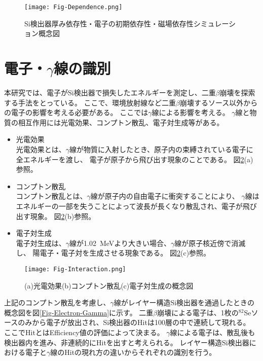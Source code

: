 \documentclass[a4paper,10pt]{jreport}
\begin{document}
\begin{figure}[H]
	\center
	\texttt{[image: Fig-Dependence.png]}
	\caption{Si検出器厚み依存性・電子の初期依存性・磁場依存性シミュレーション概念図} \label{Fig-Dependence}
\end{figure}



\section{電子・$\gamma$線の識別}

本研究では、電子がSi検出器で損失したエネルギーを測定し、二重$\beta$崩壊を探索する手法をとっている。
ここで、環境放射線など二重$\beta$崩壊するソース以外からの電子の影響を考える必要がある。
ここでは$\gamma$線による影響を考える。
$\gamma$線と物質の相互作用には光電効果、コンプトン散乱、電子対生成等がある。

\begin{itemize}
	\item 光電効果 \\
	光電効果とは、$\gamma$線が物質に入射したとき、原子内の束縛されている電子に全エネルギーを渡し、
	電子が原子から飛び出す現象のことである。
	図\ref{Fig-Interaction}(a)参照。
	
	\item コンプトン散乱 \\
	コンプトン散乱とは、$\gamma$線が原子内の自由電子に衝突することにより、
	$\gamma$線はエネルギーの一部を失うことによって波長が長くなり散乱され、電子が飛び出す現象。
	図\ref{Fig-Interaction}(b)参照。
	
	\item 電子対生成 \\
	電子対生成は、$\gamma$線が\SI{1.02}{MeV}より大きい場合、$\gamma$線が原子核近傍で消滅し、
	陽電子・電子対を生成させる現象である。
	図\ref{Fig-Interaction}(c)参照。
\end{itemize}

\begin{figure}[H]
	\center
	\texttt{[image: Fig-Interaction.png]}
	\caption{(a)光電効果(b)コンプトン散乱(c)電子対生成の概念図} \label{Fig-Interaction}
\end{figure}

上記のコンプトン散乱を考慮し、$\gamma$線がレイヤー構造Si検出器を通過したときの概念図を図\ref{Fig-Electron-Gamma}に示す。
二重$\beta$崩壊による電子は、1枚の$^{82}$Seソースのみから電子が放出され、Si検出器のHitは100層の中で連続して現れる。
ここでHitとはEfficiency値の評価によって決まる。
$\gamma$線による電子は、散乱後も検出器内を進み、非連続的にHitを出すと考えられる。
レイヤー構造Si検出器における電子と$\gamma$線のHitの現れ方の違いからそれぞれの識別を行う。
\end{document}
